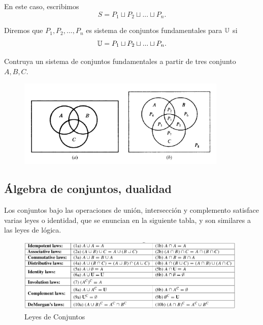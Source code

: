 En este caso, escribimos
$$
S=P_{1}\sqcup P_{2}\sqcup...\sqcup P_{n}.
$$



Diremos que $P_{1}, P_{2},...,P_{n}$ es sistema de conjuntos fundamentales para $\mathbb{U}$ si
$$
\mathbb{U} = P_{1}\sqcup P_{2}\sqcup...\sqcup P_{n}.
$$



\begin{exmp}
\label{lip:exmo:1.6}
Contruya un sistema de conjuntos fundamentales a partir de tres conjunto $A, B, C.$  
\end{exmp}



\begin{figure}
\centering
\includegraphics[width=10cm,keepaspectratio=true]{./md/sistema_fundamental.png}
\label{fig:0105}
\end{figure}




\subsection{Álgebra de conjuntos, dualidad}


	Los conjuntos bajo las operaciones de unión, intersección y complemento satisface varias leyes o identidad, que se enuncian en la siguiente tabla, y son similares a las leyes de lógica.



	\begin{figure}
		\centering
		\includegraphics[width=11cm,keepaspectratio=true]{./md/leyes_conjuntos.png}
		\caption{Leyes de Conjuntos}
		\label{fig:leyesconjuntos}
	\end{figure}
	




